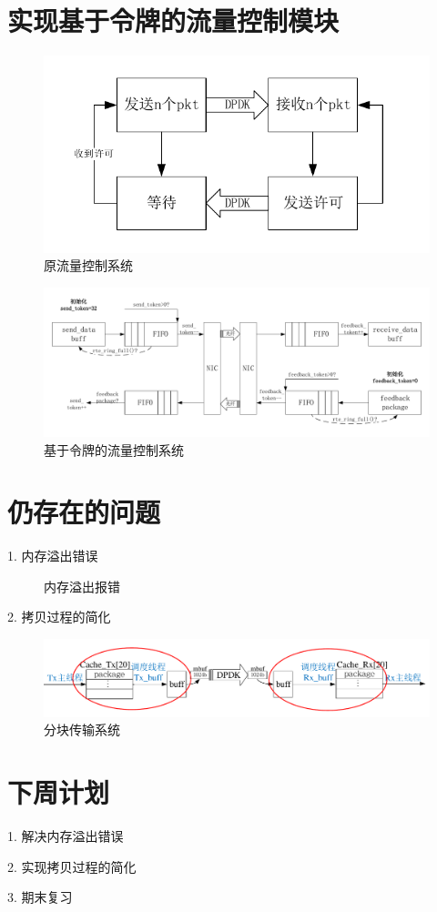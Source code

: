 \documentclass{article}
\begin{document}
\section{实现基于令牌的流量控制模块}
\begin{figure}[H]
	\centering
	\includegraphics[width = .6\textwidth]{flow_traffic.pdf}
	\caption{原流量控制系统}
\end{figure}
\begin{figure}[H]
	\centering
	\includegraphics[width = \textwidth]{frame_token.pdf}
	\caption{基于令牌的流量控制系统}
\end{figure}

\section{仍存在的问题}
1. 内存溢出错误
\begin{figure}[H]
	\centering
	\caption{内存溢出报错}
\end{figure}
2. 拷贝过程的简化
\begin{figure}[H]
	\centering
	\includegraphics[width = \textwidth]{frame_sys_copy.pdf}
	\caption{分块传输系统}
\end{figure}



\section{下周计划}
1. 解决内存溢出错误

2. 实现拷贝过程的简化

3. 期末复习
\end{document}
